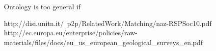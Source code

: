
Ontology is too general if 

http://disi.unitn.it/~p2p/RelatedWork/Matching/naz-RSPSoc10.pdf
http://ec.europa.eu/enterprise/policies/raw-materials/files/docs/eu_us_european_geological_surveys_en.pdf
